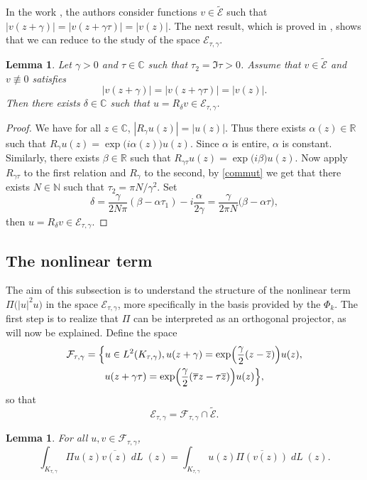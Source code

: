 \documentclass[JEP,XML,SOM,Unicode,NoFloatCountersInSection,published]{cedram}
\DeclareMathOperator{\dL}{\mathit{dL}}
\newtheorem{lemme}[theorem]{Lemma}
\theoremstyle{definition}
\let\EE\exp
\let\ov\overline
\newcommand\C{\mathbb C}
\newcommand\R{\mathbb R}
\newcommand\N{\mathbb N}
\begin{document}
In the work \cite{ABN}, the authors consider functions $v \in \widetilde{\mathcal{E}}$ such that $| v(z+\gamma)|= | v(z+\gamma\tau)|= |v(z)|$. The next result, which is proved in \cite[\S 3]{Nier2}, shows that we can reduce to the study of the space $\mathcal{E}_{\tau,\gamma}$.

\begin{lemme}\label{lem.transla}
Let $\gamma>0$ and $\tau \in \C$ such that $\tau_2=\Im \tau>0$. Assume that $v \in \widetilde{\mathcal{E}}$ and $v \not \equiv 0$ satisfies
\[
| v(z+\gamma)|= | v(z+\gamma\tau)|= |v(z)|.
\]
Then there exists $\delta \in \C$ such that $u =R_{\delta} v \in \mathcal{E}_{\tau,\gamma}$.
\end{lemme}

\begin{proof}
We have for all $z \in \C$, $|R_{\gamma}u(z)|=|u(z)|$. Thus there exists $\alpha(z)\in \R$ such that $R_{\gamma}u(z)=\EE\bigl(i \alpha(z)\bigr)u(z)$. Since $\alpha$ is entire, $\alpha$ is constant. Similarly, there exists $\beta \in \R$ such that $R_{\gamma \tau}u(z)=\EE\bigl({i \beta}\bigr) u(z)$. Now apply $R_{\gamma \tau}$ to the first relation and $R_{\gamma}$ to the second, by \eqref{commut} we get that there exists $N \in \N$ such that $\tau_2={\pi N}/{\gamma^2}$. Set
\begin{equation}\label{def-d}
\delta=\frac{\gamma}{2N\pi}(\beta-\alpha \tau_1)-i \frac{\alpha}{2 \gamma}=\frac{\gamma}{2\pi N} \bigl(\beta -\alpha \tau\bigr),
\end{equation}
then $u=R_{\delta}v\in \mathcal{E}_{\tau,\gamma}$.
\end{proof}

\subsection{The nonlinear term}

The aim of this subsection is to understand the structure of the nonlinear term $\Pi \bigl(|u|^2 u\bigr)$ in the space $\mathcal{E}_{\tau,\gamma}$, more specifically in the basis provided by the $\Phi_k$. The first step is to realize that $\Pi$ can be interpreted as an orthogonal projector, as will now be explained. Define the space\vspace*{-3pt}
\begin{multline*}
\mathcal{F}_{\tau,\gamma}=\Bigl\{u\in L^2 (K_{\tau,\gamma}), u(z+\gamma)=\EE\Bigl({\frac{\gamma}2(z-\ov{z})}\Bigr) u(z),\\
u(z+\gamma\tau) =\EE\Bigl(\frac{\gamma}2(\ov{\tau}z-\tau\ov{z})\Bigr) u(z)\Bigr\},
\end{multline*}
so that\vspace*{-3pt}
\[
\mathcal{E}_{\tau,\gamma} = \mathcal{F}_{\tau,\gamma} \cap \widetilde{\mathcal{E}}.
\]
\begin{lemme}
\label{lemmaproj}
For all $u,v\in \mathcal{F}_{\tau,\gamma}$,\vspace*{-3pt}
\begin{equation*}
\int_{K_{\tau,\gamma}} \Pi u(z) \ov{v(z)}\dL(z)= \int_{K_{\tau,\gamma}} u(z) \ov{\Pi(v(z))}\dL(z).
\end{equation*}
\end{lemme}
\end{document}
